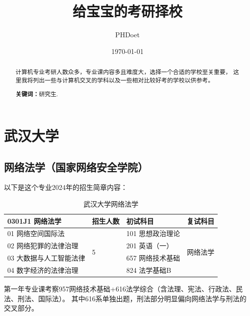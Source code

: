 \documentclass[12pt, a4paper, oneside]{ctexart}
\title{\textbf{给宝宝的考研择校}}
\author{PHDoet}
\date{\today}
\begin{document}
\maketitle

\setcounter{page}{0}
\thispagestyle{empty}

\begin{abstract}
    计算机专业考研人数众多，专业课内容多且难度大，选择一个合适的学校至关重要，
    这里我将列出一些与计算机交叉的学科以及一些相对比较好考的学校以供参考。
    \par\textbf{关键词：}研究生. 
\end{abstract}

\newpage
{}
\setcounter{page}{1}

\tableofcontents

\newpage
\setcounter{page}{1}

\section{武汉大学}

    \subsection{网络法学（国家网络安全学院）}

以下是这个专业2024年的招生简章内容：
        \begin{table}[h]
            \centering
            \caption{武汉大学网络法学}
            \begin{tabular}{|l|l|l|l|}
            \hline
                0301J1 网络法学 & 招生人数 & 初试科目 & 复试科目 \\
            \hline
                01 网络空间国际法 & \multirow{4}{*}{5} & 101 思想政治理论 & \multirow{4}{*}{网络法学} \\
            \cline{1-1}
                02 网络犯罪的法律治理 && 201 英语（一） & \\
            \cline{1-1}
                03 大数据与人工智能法律 && 657 网络技术基础 & \\
            \cline{1-1}
                04 数字经济的法律治理 && 824 法学基础B & \\
            \hline
            \end{tabular}
            \label{table_MAP}
        \end{table}
    
        第一年专业课考察957网络技术基础+616法学综合（含法理、宪法、行政法、民法、刑法、国际法）。
        其中616系单独出题，刑法部分明显偏向网络法学与刑法的交叉部分。
\end{document}
